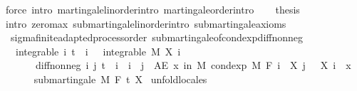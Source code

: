\begin{isabellebody}
\ {\isacharparenleft}{\kern0pt}force\ intro{\isacharcolon}{\kern0pt}\ martingale{\isacharunderscore}{\kern0pt}linorder{\isachardot}{\kern0pt}intro\ martingale{\isacharunderscore}{\kern0pt}order{\isachardot}{\kern0pt}intro{\isacharparenright}{\kern0pt}\isanewline
\ \ \isamarkupfalse%
\ {\isacharquery}{\kern0pt}thesis\ \isamarkupfalse%
\ {\isacharparenleft}{\kern0pt}intro\ zero{\isachardot}{\kern0pt}max\ submartingale{\isacharunderscore}{\kern0pt}linorder{\isachardot}{\kern0pt}intro\ submartingale{\isacharunderscore}{\kern0pt}axioms{\isacharparenright}{\kern0pt}\isanewline
{}\isamarkupfalse%
%
\endisatagproof
{\isafoldproof}%
%
\isadelimproof
\isanewline
%
\endisadelimproof
\isanewline
{}\isamarkupfalse%
\isanewline
\isanewline
{}\isamarkupfalse%
\ {\isacharparenleft}{\kern0pt}\ sigma{\isacharunderscore}{\kern0pt}finite{\isacharunderscore}{\kern0pt}adapted{\isacharunderscore}{\kern0pt}process{\isacharunderscore}{\kern0pt}order{\isacharparenright}{\kern0pt}\ submartingale{\isacharunderscore}{\kern0pt}of{\isacharunderscore}{\kern0pt}cond{\isacharunderscore}{\kern0pt}exp{\isacharunderscore}{\kern0pt}diff{\isacharunderscore}{\kern0pt}nonneg{\isacharcolon}{\kern0pt}\isanewline
\ \ \ integrable{\isacharcolon}{\kern0pt}\ {\isachardoublequoteopen}{\isasymAnd}i{\isachardot}{\kern0pt}\ t\ {\isasymle}\ i\ {\isasymLongrightarrow}\ \ integrable\ M\ {\isacharparenleft}{\kern0pt}X\ i{\isacharparenright}{\kern0pt}{\isachardoublequoteclose}\ \isanewline
\ \ \ \ \ \ \ diff{\isacharunderscore}{\kern0pt}nonneg{\isacharcolon}{\kern0pt}\ {\isachardoublequoteopen}{\isasymAnd}i\ j{\isachardot}{\kern0pt}\ t\ {\isasymle}\ i\ {\isasymLongrightarrow}\ i\ {\isasymle}\ j\ {\isasymLongrightarrow}\ AE\ x\ in\ M{\isachardot}{\kern0pt}\ cond{\isacharunderscore}{\kern0pt}exp\ M\ {\isacharparenleft}{\kern0pt}F\ i{\isacharparenright}{\kern0pt}\ {\isacharparenleft}{\kern0pt}{\isasymlambda}{\isasymxi}{\isachardot}{\kern0pt}\ X\ j\ {\isasymxi}\ {\isacharminus}{\kern0pt}\ X\ i\ {\isasymxi}{\isacharparenright}{\kern0pt}\ x\ {\isasymge}\ {}{\isachardoublequoteclose}\isanewline
\ \ \ \ \ {\isachardoublequoteopen}submartingale\ M\ F\ t\ X{\isachardoublequoteclose}\isanewline
%
\isadelimproof
%
\endisadelimproof
%
\isatagproof
{}\isamarkupfalse%
\ {\isacharparenleft}{\kern0pt}unfold{\isacharunderscore}{\kern0pt}locales{\isacharparenright}{\kern0pt}\isanewline

\end{isabellebody}
